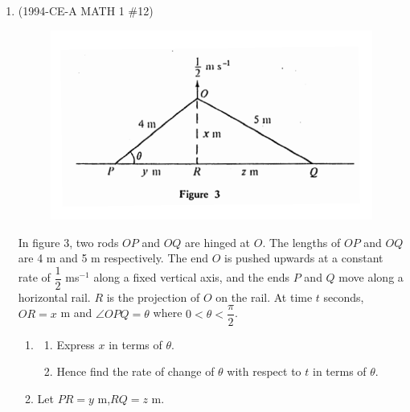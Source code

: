 \documentclass[12pt]{article}
\begin{document}
\begin{enumerate}
            \hrulefill
            
            \hrulefill
            
            \hrulefill
            
            \hrulefill
            
            \hrulefill
            
            \hrulefill
            
            \hrulefill

        \pagebreak
        \item (1994-CE-A MATH 1 \#12) 
        \begin{figure}[H]
            \centering
            \includegraphics[scale=1.4]{1994CE_A_MATH_1_12.png}
        \end{figure}
        In figure 3, two rods $OP$ and $OQ$ are hinged at $O$. The lengths of $OP$ and $OQ$ are 4 m and 5 m respectively. The end $O$ is pushed upwards at a constant rate of $\dfrac{1}{2}$ ms$^{-1}$ along a fixed vertical axis, and the ends $P$ and $Q$ move along a horizontal rail. $R$ is the projection of $O$ on the rail. At time $t$ seconds, $OR = x$ m and $\angle OPQ=\theta$ where $0<\theta<\dfrac{\pi}{2}$.\begin{enumerate}
            \item \begin{enumerate}
                \item Express $x$ in terms of $\theta$. 
                \item Hence find the rate of change of $\theta$ with respect to $t$ in terms of $\theta$.
            \end{enumerate}
            \item Let $PR=y$ m,$RQ=z$ m.\begin{enumerate}

\end{enumerate}
\end{enumerate}
\end{enumerate}
\end{document}
